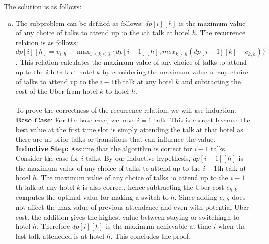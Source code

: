 \documentclass[10pt]{article}
\begin{document}
\begin{solution} The solution is as follows:
    \begin{enumerate} [(a)]
        \item The subproblem can be defined as follows: $dp[i][h]$ is the maximum value of any choice of talks to attend up to the $i$th talk at hotel $h$. The recurrence relation is as follows: $dp[i][h] = v_{i,h} + \max_{1 \leq k \leq 3} \{ dp[i-1][h], max_{k \neq h}(dp[i-1][k] - c_{k,h})\}$. This relation calculates the maximum value of any choice of talks to attend up to the $i$th talk at hotel $h$ by considering the maximum value of any choice of talks to attend up to the $i-1$th talk at any hotel $k$ and subtracting the cost of the Uber from hotel $k$ to hotel $h$. \\\\
        To prove the correctness of the recurrence relation, we will use induction. \\
        \textbf{Base Case:} For the base case, we have $i = 1$ talk. This is correct because the best value at the first time slot is simply attending the talk at that hotel as there are no prior talks or transitions that can influence the value. \\
        \textbf{Inductive Step:} Assume that the algorithm is correct for $i-1$ talks. Consider the case for $i$ talks. By our inductive hypothesis, $dp[i-1][h]$ is the maximum value of any choice of talks to attend up to the $i-1$th talk at hotel $h$. The maximum value of any choice of talks to attend up to the $i-1$th talk at any hotel $k$ is also correct, hence subtracting the Uber cost $c_{h,k}$ computes the optimal value for making a switch to $h$. Since adding $v_{i,h}$ does not affect the max value of previous attendence and even with potential Uber cost, the addition gives the highest value between staying or switchingh to hotel $h$. Therefore $dp[i][h]$ is the maximum achievable at time $i$ when the last talk atteneded is at hotel $h$. This concludes the proof.\\\\



\end{enumerate}
\end{solution}
\end{document}
